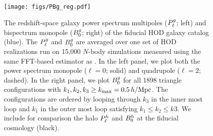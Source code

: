 \begin{figure}
\begin{center}
    \texttt{[image: figs/PBg\_reg.pdf]} 
    \caption{The redshift-space galaxy power spectrum multipoles ($P^g_{\ell}$; left)
    and bispectrum monopole ($B^g_0$; right) of the fiducial HOD galaxy catalog (blue).
    The $P^g_{\ell}$ and $B^g_0$ are averaged over one set of HOD realizations run on
    15,000 $N$-body \quij simulations measured using the same FFT-based estimator as \cite{hahn2020}. In the 
    left panel, we plot both the power spectrum monopole ($\ell = 0$; solid) and quadrupole 
    ($\ell = 2$; dashed). In the right panel, we plot $B^g_0$ for all 1898 triangle
    configurations with $k_1, k_2, k_3 \ge k_{\rm max} = 0.5\,h/\mathrm{Mpc}$. The
    configurations are ordered by looping through $k_3$ in the inner most loop
    and $k_1$ in the outer most loop satisfying $k_1 \le k_2 \le k3$.
    We include for comparison the \cite{hahn2020} halo $P^h_{\ell}$ and $B^h_0$ at the 
    fiducial cosmology (black). %
    }
\label{fig:bgh}
\end{center}
\end{figure}

